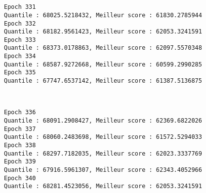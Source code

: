 \documentclass[11pt]{article}
\begin{document}
    \begin{center}
    \end{center}
    { \hspace*{\fill} \\}
    
    \begin{center}
    \end{center}
    { \hspace*{\fill} \\}
    
    \begin{Verbatim}[commandchars=\\\{\}]
Epoch 331
Quantile : 68025.5218432, Meilleur score : 61830.2785944
Epoch 332
Quantile : 68182.9561423, Meilleur score : 62053.3241591
Epoch 333
Quantile : 68373.0178863, Meilleur score : 62097.5570348
Epoch 334
Quantile : 68587.9272668, Meilleur score : 60599.2990285
Epoch 335
Quantile : 67747.6537142, Meilleur score : 61387.5136875

    \end{Verbatim}

    \begin{center}
    \end{center}
    { \hspace*{\fill} \\}
    
    \begin{Verbatim}[commandchars=\\\{\}]
Epoch 336
Quantile : 68091.2908427, Meilleur score : 62369.6822026
Epoch 337
Quantile : 68060.2483698, Meilleur score : 61572.5294033
Epoch 338
Quantile : 68297.7182035, Meilleur score : 62023.3337769
Epoch 339
Quantile : 67916.5961307, Meilleur score : 62343.4052966
Epoch 340
Quantile : 68281.4523056, Meilleur score : 62053.3241591

    \end{Verbatim}

    \begin{center}
    \end{center}
    { \hspace*{\fill} \\}
    
    \begin{center}
    \end{center}
    { \hspace*{\fill} \\}
    
\end{document}
